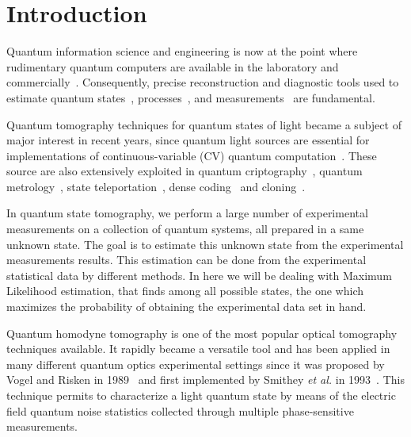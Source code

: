 \documentclass[
reprint,
superscriptaddress,
showpacs,
amsmath,
amssymb,
aps,
pra,
longbibliography
]{revtex4-1}
\begin{document}
\section{Introduction}
\label{intro}
Quantum information science and engineering is now at the point where 
rudimentary quantum computers are available in the laboratory and 
commercially~\cite{kandala2017,Linke2017,Monk2017,Denchev2016}.
Consequently, precise reconstruction and diagnostic tools used to estimate 
quantum states~\cite{Vogel1989, Smithey1993, Dunn1995, Banaszek1999, Banaszek2000, White2002, Ourjoumtsev2007, Neergaard2006}, processes~\cite{Chuang1997, Poyatos1997, Altepeter2003, Dariano1998, Nielsen1998, Mitchell2003, Obrien2004,Kupchak2015}, and measurements~\cite{Luis1999, Fiurasek2001, Dariano2004, Lundeen2009} are fundamental.

Quantum tomography techniques for quantum states of light became a subject of
major interest in recent years, since quantum light sources are essential
for implementations of continuous-variable (CV) quantum computation~\cite{Lloyd1999, Gottesman2001, Bartlett2002, Jeong2002, Ralph2003}. These source are also extensively exploited in quantum criptography~\cite{Ralph1999, Hillery2000, Silberhorn2002, Pirandola2008, Luiz2017}, quantum metrology~\cite{Eberle2010, Demkowicz2013}, state teleportation~\cite{Vaidman1994, Braunstein1998, He2015}, dense coding~\cite{Braunstein2000, Lee2014} and cloning~\cite{Cerf2000, Braunstein2001}. 

In quantum state tomography, we perform a large number of experimental measurements on
a collection of quantum systems, all prepared in a same unknown state. The goal is to
estimate this unknown state from the experimental measurements results. This estimation
can be done from the experimental statistical data by different methods. In here
we will be dealing with Maximum Likelihood estimation, that finds among all possible
states, the one which maximizes the probability of obtaining the experimental data set
in hand. 

Quantum homodyne tomography is one of the most popular optical tomography techniques
available. It rapidly became a versatile tool and has been applied in many different quantum optics experimental settings since it was proposed by Vogel and Risken in 1989~\cite{Vogel1989} and first implemented by Smithey \textit{et al.} in 1993~\cite{Smithey1993}. This technique permits to characterize a light quantum state by means of the electric field quantum noise statistics collected through multiple phase-sensitive measurements. 
\end{document}

